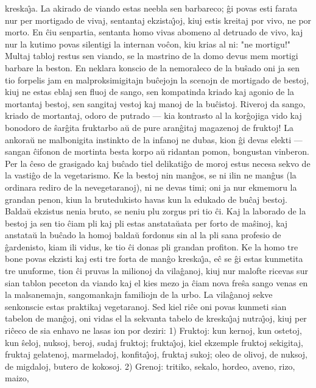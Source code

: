 kreska\^{\j}a. La akirado de viando estas neebla sen barbareco; \^gi
povas esti farata nur per mortigado de vivaj, sentantaj
ekzista\^{\j}oj, kiuj estis kreitaj por vivo, ne por morto. En \^ciu
senpartia, sentanta homo vivas abomeno al detruado de vivo, kaj nur
la kutimo povas silentigi la internan vo\^con, kiu krias al ni: "ne
mortigu!" Multaj tabloj restus sen viando, se la mastrino de la
domo devus mem mortigi barbare la beston. En neklara konscio de la
nemoraleco de la bu\^sado oni ja sen tio forpelis jam en
malproksimigitajn bu\^cejojn la scenojn de mortigado de bestoj, kiuj
ne estas eblaj sen fluoj de sango, sen kompatinda kriado kaj agonio
de la mortantaj bestoj, sen sangitaj vestoj kaj manoj de la
bu\^cistoj. Riveroj da sango, kriado de mortantaj, odoro de putrado
--- kia kontrasto al la kor\^gojiga vido kaj bonodoro de \^sar\^gita
fruktarbo a\u u de pure aran\^gitaj magazenoj de fruktoj! La
ankora\u u ne malbonigita instinkto de la infanoj ne dubas, kion
\^gi devas elekti --- sangan \^cifonon de mortinta besta korpo a\u u
ridantan pomon, bongustan vinberon. Per la \^ceso de grasigado kaj
bu\^cado tiel delikati\^go de moroj estus necesa sekvo de la
vasti\^go de la vegetarismo. Ke la bestoj nin man\^gos, se ni ilin
ne man\^gus (la ordinara rediro de la nevegetaranoj), ni ne devas
timi; oni ja nur ekmemoru la grandan penon, kiun la brutedukisto
havas kun la edukado de bu\^caj bestoj. Balda\u u ekzistus nenia
bruto, se neniu plu zorgus pri tio \^ci. Kaj la laborado de la
bestoj ja sen tio \^ciam pli kaj pli estas anstata\u uata per forto
de ma\^sinoj, kaj anstata\u u la bu\^cado la homoj balda\u u
fordonus sin al la pli sana profesio de \^gardenisto, kiam ili
vidus, ke tio \^ci donas pli grandan profiton. Ke la homo tre bone
povas ekzisti kaj esti tre forta de man\^go kreska\^{\j}a, e\^c se
\^gi estas kunmetita tre unuforme, tion \^ci pruvas la milionoj da
vila\^ganoj, kiuj nur malofte ricevas sur sian tablon peceton da
viando kaj el kies mezo ja \^ciam nova fre\^sa sango venas en la
malsanemajn, sangomankajn familiojn de la urbo. La vila\^ganoj sekve
senkonscie estas praktikaj vegetaranoj. Sed kiel ri\^ce oni povas
kunmeti sian tabelon de man\^goj, oni vidas el la sekvanta tabelo de
kreska\^{\j}aj nutra\^{\j}oj, kiuj per ri\^ceco de sia enhavo ne
lasas ion por deziri: 1) Fruktoj: kun kernoj, kun ostetoj, kun
\^seloj, nuksoj, beroj, sudaj fruktoj; frukta\^{\j}oj, kiel ekzemple
fruktoj sekigitaj, fruktaj gelatenoj, marmeladoj, konfita\^{\j}oj,
fruktaj sukoj; oleo de olivoj, de nuksoj, de migdaloj, butero de
kokosoj. 2) Grenoj: tritiko, sekalo, hordeo, aveno, rizo, maizo,
